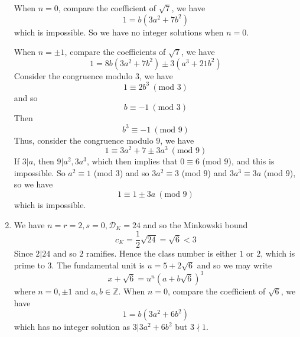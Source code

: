 \begin{enumerate}
When $n=0$, compare the coefficient of $\sqrt{7}$, we have
$$1=b(3a^2+7b^2)$$
which is impossible. So we have no integer solutions when $n=0$.

When $n=\pm 1$, compare the coefficients of $\sqrt{7}$, we have
$$1=8b(3a^2+7b^2)\pm 3(a^3+21b^2)$$
Consider the congruence modulo $3$, we have
$$1 \equiv 2b^3~(\text{mod }3)$$
and so
$$b \equiv -1~(\text{mod }3)$$
Then
$$b^3 \equiv -1~(\text{mod }9)$$
Thus, consider the congruence modulo $9$, we have
$$1 \equiv 3a^2+7 \pm 3a^3~(\text{mod } 9)$$
If $3|a$, then $9|a^2,3a^3$, which then implies that $0 \equiv 6$ (mod $9$), and this is impossible.
So $a^2 \equiv 1$ (mod $3$) and so $3a^2 \equiv 3$ (mod $9$) and $3a^3 \equiv 3a$ (mod $9$), so we have
$$1 \equiv 1 \pm 3a~(\text{mod } 9)$$
which is impossible.
\item We have $n=r=2,s=0, \mathcal{D}_K=24$ and so the Minkowski bound
$$c_K=\frac{1}{2}\sqrt{24}=\sqrt{6}<3$$
Since $2|24$ and so $2$ ramifies. Hence the class number is either $1$ or $2$, which is prime to $3$.
The fundamental unit is $u=5+2\sqrt{6}$ and so we may write
$$x+\sqrt{6}=u^n (a+b\sqrt{6})^3$$
where $n=0,\pm 1$ and $a,b \in \mathbb{Z}$.
When $n=0$, compare the coefficient of $\sqrt{6}$, we have
$$1=b(3a^2+6b^2)$$
which has no integer solution as $3|3a^2+6b^2$ but $3 \nmid 1$.


\end{enumerate}
